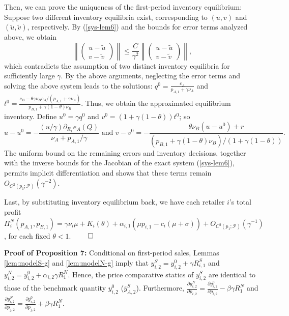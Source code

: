 \documentclass[nonblindrev,copyedit]{informs1}
\begin{document}
\begin{APPENDICES}
Then, we can prove the uniqueness of the first-period inventory equilibrium: Suppose two different inventory equilibria exist, corresponding to $(u,v)$ and $(\tilde u, \tilde v)$,   respectively. By (\ref{sys-lem6}) and the bounds for error terms analyzed above, we obtain
\[
\left\| \begin{pmatrix} u - \tilde{u} \\ v - \tilde{v} \end{pmatrix} \right\| \leq \frac{C}{\gamma^2} \left\| \begin{pmatrix} u - \tilde{u} \\ v - \tilde{v} \end{pmatrix} \right\|,
\]
which contradicts the assumption of two distinct inventory equilibria for sufficiently large $\gamma$. By the above arguments, neglecting the error terms and solving the above system leads to the solutions: $q^0=\frac{c_A}{p_{A,1}+\gamma\nu_A}$ and $t^0 =\frac{c_B-\theta\gamma\nu_Bc_A/(p_{A,1}+\gamma\nu_A)}{p_{B,1}+\gamma(1-\theta)\nu_B}$. Thus, we obtain the approximated equilibrium inventory. Define $u^0 = \gamma q^0$ and $v^0 = (1+\gamma(1-\theta))t^0$; so
\begin{equation*}
    u - u^0 = - \frac{(u/\gamma)\partial_{R_1} e_A(Q)}{\nu_A + p_{A,1}/\gamma} \text{ and } v - v^0 = - \frac{\theta\nu_B(u - u^0) + r}{(p_{B,1} + \gamma(1-\theta)\nu_B)/(1 + \gamma(1-\theta))}.
\end{equation*}
The uniform bound on the remaining errors and inventory decisions, together with the inverse bounds for the Jacobian of the exact system (\ref{sys-lem6}), permits implicit differentiation and shows that these terms remain $O_{C^2(p_1;\mathcal{P})}(\gamma^{-2})$.

Last, by substituting inventory equilibrium back, we have each retailer $i$'s total profit $\Pi_i^N(p_{A,1},p_{B,1}) =\gamma\nu_i\mu+K_i(\theta)+\alpha_{i,1}(\mu p_{i,1}-c_i(\mu + \sigma))+O_{C^2(p_1;\mathcal{P})}(\gamma^{-1})$, for each fixed $\theta<1$.  $\qed$

{\bf Proof of Proposition 7: } Conditional on first-period sales, Lemmas \ref{lem:modelS-g} and \ref{lem:modelN-g} imply that $y_{i,2}^S=y_{i,2}^0+\gamma R_{i,1}^S$ and $y_{i,2}^N=y_{i,2}^0+\alpha_{i,2}\gamma R_1^N$. Hence, the price comparative statics of $y_{i,2}^S$ are identical to those of the benchmark quantity $y_{i,2}^0$ ($\overline{y}^S_{A,2}$).
Furthermore, $\frac{\partial y^N_{i,2}}{\partial p_{i,2}} = \frac{\partial y^0_{i,2}}{\partial p_{i,2}} - \beta \gamma R^N_1$ and $\frac{\partial y^N_{i,2}}{\partial p_{j,2}} = \frac{\partial y^0_{i,2}}{\partial p_{j,2}} + \beta \gamma R^N_1$.


\end{APPENDICES}
\end{document}
